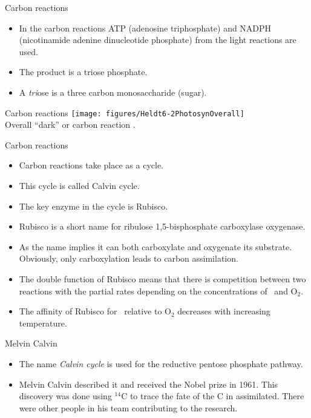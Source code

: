 \documentclass[10pt]{beamer}
\begin{document}
\begin{frame}{Carbon reactions}
\begin{itemize}
        \item In the carbon reactions ATP (adenosine triphosphate) and NADPH
        (nicotinamide adenine dinucleotide phosphate) from the
        light reactions are used.
        \item The product is a triose phosphate.
        \item A \emph{tri}ose is a three carbon monosaccharide (sugar).
    \end{itemize}
\end{frame}

\begin{frame}{Carbon reactions}
    \centering
    \texttt{[image: figures/Heldt6-2PhotosynOverall]}\\
    {\small Overall ``dark'' or carbon reaction \autocite[from][]{Heldt1997}.}
\end{frame}

\begin{frame}{Carbon reactions}
    \begin{itemize}
        \item Carbon reactions take place as a cycle.
        \item This cycle is called Calvin cycle.
        \item The key enzyme in the cycle is Rubisco.
        \item Rubisco is a short name for ribulose 1,5-bisphosphate
        carboxylase oxygenase.
        \item As the name implies it can both carboxylate and oxygenate
        its substrate. Obviously, only carboxylation leads to carbon
        assimilation.
        \item The double function of Rubisco means that there is
        competition between two reactions with the partial rates
        depending on the concentrations of \COtwo\ and O$_2$.
        \item The affinity of Rubisco for \COtwo\ relative to O$_2$ decreases
        with increasing temperature.
    \end{itemize}
\end{frame}

\begin{frame}{Melvin Calvin}
    \begin{itemize}
        \item The name \emph{Calvin cycle} is used for the
        reductive pentose phosphate pathway.
        \item Melvin Calvin described it and received the
        Nobel prize in 1961. This discovery was done using $^{14}$C to trace
        the fate of the C in \COtwo assimilated. There were other
        people in his team contributing to the research.
    \end{itemize}
\end{frame}
\end{document}
